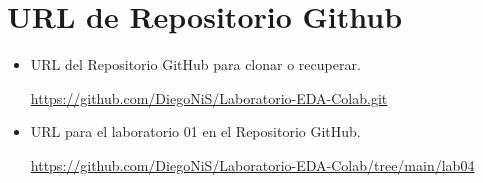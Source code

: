 \section{URL de Repositorio Github}
\begin{itemize}
	\item URL del Repositorio GitHub para clonar o recuperar.
	
	\url{https://github.com/DiegoNiS/Laboratorio-EDA-Colab.git}
	\item URL para el laboratorio 01 en el Repositorio GitHub.
	
	\url{https://github.com/DiegoNiS/Laboratorio-EDA-Colab/tree/main/lab04}
\end{itemize}